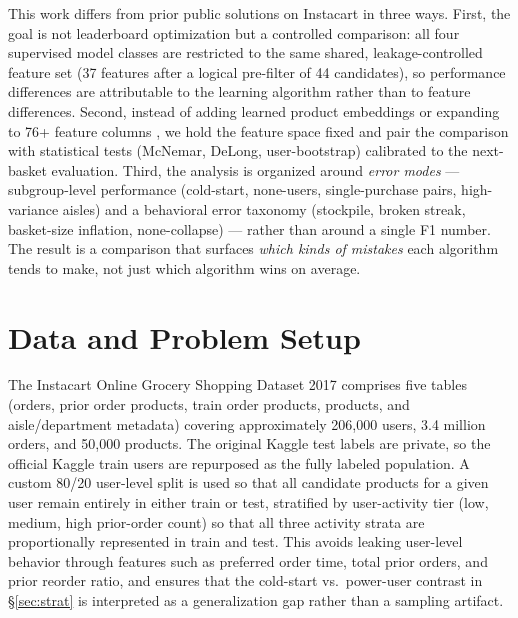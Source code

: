 \documentclass[10pt,twocolumn]{article}
\begin{document}
This work differs from prior public solutions on Instacart in three ways. First, the goal is not leaderboard optimization but a controlled comparison: all four supervised model classes are restricted to the same shared, leakage-controlled feature set (37 features after a logical pre-filter of 44 candidates), so performance differences are attributable to the learning algorithm rather than to feature differences. Second, instead of adding learned product embeddings \citep{vasquez2017instacart} or expanding to 76+ feature columns \citep{bhat2022instacart}, we hold the feature space fixed and pair the comparison with statistical tests (McNemar, DeLong, user-bootstrap) calibrated to the next-basket evaluation. Third, the analysis is organized around \emph{error modes} --- subgroup-level performance (cold-start, none-users, single-purchase pairs, high-variance aisles) and a behavioral error taxonomy (stockpile, broken streak, basket-size inflation, none-collapse) --- rather than around a single F1 number. The result is a comparison that surfaces \emph{which kinds of mistakes} each algorithm tends to make, not just which algorithm wins on average.

\section{Data and Problem Setup}
\label{sec:data}

The Instacart Online Grocery Shopping Dataset 2017 \citep{instacart2017dataset} comprises five tables (orders, prior order products, train order products, products, and aisle/department metadata) covering approximately 206{,}000 users, 3.4 million orders, and 50{,}000 products. The original Kaggle test labels are private, so the official Kaggle train users are repurposed as the fully labeled population. A custom 80/20 user-level split is used so that all candidate products for a given user remain entirely in either train or test, stratified by user-activity tier (low, medium, high prior-order count) so that all three activity strata are proportionally represented in train and test. This avoids leaking user-level behavior through features such as preferred order time, total prior orders, and prior reorder ratio, and ensures that the cold-start vs.\ power-user contrast in \S\ref{sec:strat} is interpreted as a generalization gap rather than a sampling artifact.
\end{document}
